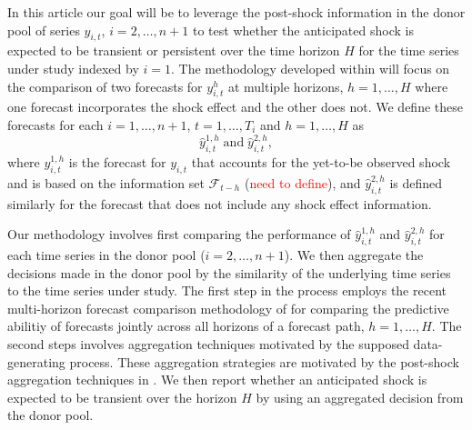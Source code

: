 \documentclass[11pt]{article}
\theoremstyle{definition}
\begin{document}
In this article our goal will be to leverage the post-shock information in the donor pool of series $y_{i,t}$, $i = 2,\ldots,n+1$ to test whether the anticipated shock is expected to be transient or persistent over the time horizon $H$ for the time series under study indexed by $i=1$. The methodology developed within will focus on the comparison of two forecasts for $y_{i,t}^h$ at multiple horizons, $h = 1, \ldots, H$ where one forecast incorporates the shock effect and the other does not. We define these forecasts for each $i = 1,\ldots,n+1$, $t = 1,\ldots,T_i$ and $h = 1,\ldots,H$ as
$$
  \hat y^{1,h}_{i,t} \; \text{and} \; \hat y^{2,h}_{i,t},
$$
where $y^{1,h}_{i,t}$ is the forecast for $y_{i,t}$ that accounts for the yet-to-be observed shock and is based on the information set $\mathcal{F}_{t-h}$ (\textcolor{red}{need to define}), and $\hat y^{2,h}_{i,t}$ is defined similarly for the forecast that does not include any shock effect information.


Our methodology involves first comparing the performance of $\hat y^{1,h}_{i,t}$ and $\hat y^{2,h}_{i,t}$ for each time series in the donor pool ($i = 2,\ldots,n+1$). We then aggregate the decisions made in the donor pool by the similarity of the underlying time series to the time series under study. The first step in the process employs the recent multi-horizon forecast comparison methodology of \cite{quaedvlieg2021multi} for comparing the predictive abilitiy of forecasts jointly across all horizons of a forecast path, $h = 1,\ldots, H$. The second steps involves aggregation techniques motivated by the supposed data-generating process. These aggregation strategies are motivated by the post-shock aggregation techniques in \cite{lin2021minimizing}. We then report whether an anticipated shock is expected to be transient over the horizon $H$ by using an aggregated decision from the donor pool.
\end{document}
